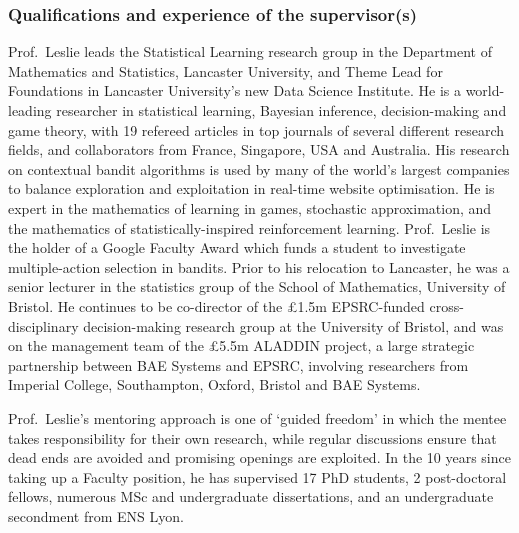 \documentclass[a4paper,11pt]{article}
\renewcommand{\cite}{\autocite} %
\begin{document}
%

\subsubsection*{Qualifications and experience of the supervisor(s)}

Prof.\ Leslie leads the Statistical Learning research group in the Department of Mathematics and Statistics, Lancaster University, and Theme Lead for Foundations in Lancaster University's new Data Science Institute.  He is a world-leading researcher in statistical learning, Bayesian inference, decision-making and game theory, with 19 refereed articles in top journals of several different research fields, and collaborators from France, Singapore, USA and Australia.  His research on contextual bandit algorithms \cite{MayEtAl2012} is used by many of the world's largest companies to balance exploration and exploitation in real-time website optimisation.  He is expert in the mathematics of learning in games, \cite{LeslieCollins03,LeslieCollins05,LeslieCollins06,ChapmanEtAl2013,PerkinsLeslie2014} stochastic approximation, \cite{LeslieCollins03,PerkinsLeslie2012,PerkinsLeslie2014} and the mathematics of statistically-inspired reinforcement learning. \cite{LeslieCollins05,LarsenEtAl2010}  Prof.\ Leslie is the holder of a Google Faculty Award which funds a student to investigate multiple-action selection in bandits.  Prior to his relocation to Lancaster, he was a senior lecturer in the statistics group of the School of Mathematics, University of Bristol.  He continues to be co-director of the \pounds1.5m EPSRC-funded cross-disciplinary decision-making research group at the University of Bristol, and was on the management team of the \pounds5.5m ALADDIN project, a large strategic partnership between BAE Systems and EPSRC, involving researchers from Imperial College, Southampton, Oxford, Bristol and BAE Systems.

Prof.\ Leslie's mentoring approach is one of `guided freedom' in which the mentee takes responsibility for their own research, while regular discussions ensure that dead ends are avoided and promising openings are exploited.  In the 10 years since taking up a Faculty position, he has supervised 17 PhD students, 2 post-doctoral fellows, numerous MSc and undergraduate dissertations, and an undergraduate secondment from ENS Lyon.
\end{document}
